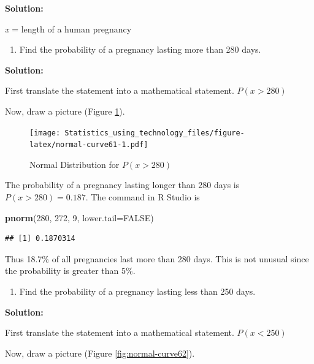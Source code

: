 \documentclass[]{book}
\newenvironment{Shaded}{\begin{snugshade}}{\end{snugshade}}
\newcommand{\DataTypeTok}[1]{\textcolor[rgb]{0.13,0.29,0.53}{#1}}
\newcommand{\DecValTok}[1]{\textcolor[rgb]{0.00,0.00,0.81}{#1}}
\newcommand{\KeywordTok}[1]{\textcolor[rgb]{0.13,0.29,0.53}{\textbf{#1}}}
\newcommand{\NormalTok}[1]{#1}
\newcommand{\OtherTok}[1]{\textcolor[rgb]{0.56,0.35,0.01}{#1}}
\providecommand{\tightlist}{%
  \setlength{\itemsep}{0pt}\setlength{\parskip}{0pt}}
\begin{document}
\textbf{Solution:}

\emph{x} = length of a human pregnancy

\begin{enumerate}
\def\labelenumi{\alph{enumi}.}
\setcounter{enumi}{1}
\tightlist
\item
  Find the probability of a pregnancy lasting more than 280 days.
\end{enumerate}

\textbf{Solution:}

First translate the statement into a mathematical statement. \(P(x>280)\)

Now, draw a picture (Figure \ref{fig:normal-curve61}).



\begin{figure}
\centering
\texttt{[image: Statistics\_using\_technology\_files/figure-latex/normal-curve61-1.pdf]}
\caption{\label{fig:normal-curve61}Normal Distribution for \(P(x>280)\)}
\end{figure}

The probability of a pregnancy lasting longer than 280 days is \(P(x>280)=0.187\). The command in R Studio is

\begin{Shaded}
\begin{Highlighting}[]
\KeywordTok{pnorm}\NormalTok{(}\DecValTok{280}\NormalTok{, }\DecValTok{272}\NormalTok{, }\DecValTok{9}\NormalTok{, }\DataTypeTok{lower.tail=}\OtherTok{FALSE}\NormalTok{)}
\end{Highlighting}
\end{Shaded}

\begin{verbatim}
## [1] 0.1870314
\end{verbatim}

Thus 18.7\% of all pregnancies last more than 280 days. This is not
unusual since the probability is greater than 5\%.

\begin{enumerate}
\def\labelenumi{\alph{enumi}.}
\setcounter{enumi}{2}
\tightlist
\item
  Find the probability of a pregnancy lasting less than 250 days.
\end{enumerate}

\textbf{Solution:}

First translate the statement into a mathematical statement. \(P(x<250)\)

Now, draw a picture (Figure \ref{fig:normal-curve62}).
\end{document}
